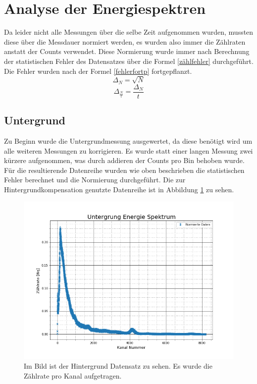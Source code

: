 \section{Analyse der Energiespektren}
Da leider nicht alle Messungen über die selbe Zeit aufgenommen wurden, mussten diese über die Messdauer normiert werden, es wurden also immer die Zählraten anstatt der Counts verwendet. Diese Normierung wurde immer nach 
Berechnung der  statistischen Fehler des Datensatzes über die Formel \ref{zählfehler} durchgeführt. Die Fehler wurden nach der Formel \ref{fehlerfortp} fortgepflanzt.
\begin{equation}
\Delta_N = \sqrt{N}
\label{zählfehler}
\end{equation}
\begin{equation}
	\Delta_\frac{N}{t} = \frac{\Delta_N}{t} 
	\label{fehlerfortp}
\end{equation}
\subsection{Untergrund}
Zu Beginn wurde die Untergrundmessung ausgewertet, da diese benötigt wird um alle weiteren Messungen zu korrigieren. Es wurde statt einer langen Messung zwei kürzere aufgenommen, was durch addieren der Counts pro Bin behoben wurde.
Für die resultierende Datenreihe wurden wie oben beschrieben die statistischen Fehler berechnet und die Normierung durchgeführt. Die zur Hintergrundkompensation genutzte Datenreihe ist in Abbildung \ref{untergrund} zu sehen.
\begin{figure}[h]
	\centering
	\includegraphics[scale=0.5]{Bilder/untergrund}
	\caption[Normalisierter Hintergrund]{\small Im Bild ist der Hintergrund Datensatz zu sehen. Es wurde die Zählrate pro Kanal aufgetragen. }
	\label{untergrund}
\end{figure}
